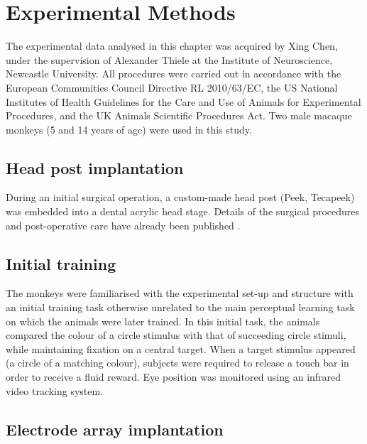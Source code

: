 \section{Experimental Methods}
\label{ch:exp}

The experimental data analysed in this chapter was acquired by Xing Chen, under the supervision of Alexander Thiele at the Institute of Neuroscience, Newcastle University.
All procedures were carried out in accordance with the European Communities Council Directive RL 2010/63/EC, the US National Institutes of Health Guidelines for the Care and Use of Animals for Experimental Procedures, and the UK Animals Scientific Procedures Act. Two male macaque monkeys (5 and 14 years of age) were used in this study.


\subsection{Head post implantation}

During an initial surgical operation, a custom-made head post (Peek, Tecapeek) was embedded into a dental acrylic head stage.
Details of the surgical procedures and post-operative care have already been published \citep[see][]{Thiele2006}.


\subsection{Initial training}

The monkeys were familiarised with the experimental set-up and structure with an initial training task otherwise unrelated to the main perceptual learning task on which the animals were later trained.
In this initial task, the animals compared the colour of a circle stimulus with that of succeeding circle stimuli, while maintaining fixation on a central target.
When a target stimulus appeared (a circle of a matching colour), subjects were required to release a touch bar in order to receive a fluid reward.
Eye position was monitored using an infrared video tracking system.%


\subsection{Electrode array implantation}

